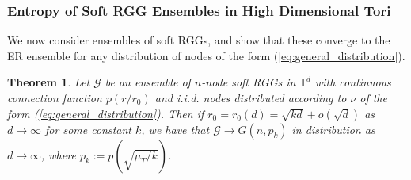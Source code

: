 \documentclass{article}
\newtheorem{theorem}{Theorem}
\newcommand{\tti}{\rightarrow\infty}
\newcommand{\graph}{\mathcal{G}}
\begin{document}
\subsubsection{Entropy of Soft RGG Ensembles in High Dimensional Tori}
We now consider ensembles of soft RGGs, and show that these converge to the ER ensemble for any distribution of nodes of the form (\ref{eq:general_distribution}).
\begin{theorem}
    \label{thm:soft_torus_entropy}
    Let $\mathcal{G}$ be an ensemble of $n$-node soft RGGs in $\mathbb{T}^d$ with  continuous  connection function $p(r/r_0)$ and i.i.d. nodes distributed according to $\nu$ of the form (\ref{eq:general_distribution}). Then if $r_0 = r_0(d) = \sqrt{kd} + o(\sqrt{d})$ as $d\tti$ for some constant $k$, we have that $\graph \rightarrow G(n,p_k)$ in distribution as $d\tti$, where $p_k := p(\sqrt{\mu_T/k})$.
\end{theorem}
\end{document}
